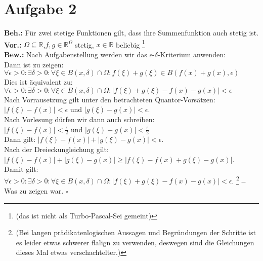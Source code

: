 \documentclass[12pt, a4paper]{article}
\newcommand*{\qed}{\null\nobreak\hfill\ensuremath{\square}}
\newcommand*{\puffer}{\text{ }\text{ }\text{ }\text{ }}
\newcommand*{\gedanke}{\textbf{-- }}
\begin{document}
\section*{Aufgabe 2}
\textbf{Beh.:} Für zwei stetige Funktionen gilt, dass ihre Summenfunktion auch stetig ist. \\
\textbf{Vor.:} \(\Omega \subseteq \mathbb{R}\),\puffer\(f,g \in \mathbb{R}^\Omega\) stetig, \puffer \(x \in \mathbb{R}\) beliebig \footnote{(das ist nicht als Turbo-Pascal-Sei gemeint)} \\
\textbf{Bew.:} Nach Aufgabenstellung werden wir das \(\epsilon\)-\(\delta\)-Kriterium anwenden:\\
Dann ist zu zeigen: \\
\(\forall \epsilon > 0: \exists \delta > 0: \forall \xi \in B(x, \delta) \cap \Omega: f(\xi) + g(\xi) \in B(f(x) + g(x), \epsilon)\) \\
Dies ist äquivalent zu:\\
\(\forall \epsilon > 0: \exists \delta > 0: \forall \xi \in B(x, \delta) \cap \Omega: |f(\xi) + g(\xi) - f(x) - g(x)|  < \epsilon\) \\
Nach Vorrausetzung gilt unter den betrachteten Quantor-Vorsätzen: \\
\(|f(\xi) - f(x)| < \epsilon\) und \(|g(\xi) - g(x)| < \epsilon\). \\
Nach Vorlesung dürfen wir dann auch schreiben: \\
\(|f(\xi) - f(x)| < \frac\epsilon 2\) und \(|g(\xi) - g(x)| < \frac\epsilon 2\) \\
Dann gilt: \(|f(\xi) - f(x)| + |g(\xi) - g(x)| < \epsilon\). \\
Nach der Dreieckungleichung gilt:\\
\(|f(\xi) - f(x)| + |g(\xi) - g(x)| \ge |f(\xi) - f(x) + g(\xi) - g(x)|\). \\
Damit gilt: \(\forall \epsilon > 0: \exists \delta > 0: \forall \xi \in B(x, \delta) \cap \Omega: |f(\xi) + g(\xi) - f(x) - g(x)|  < \epsilon\). \footnote{(Bei langen prädikatenlogischen Aussagen und Begründungen der Schritte ist es leider etwas schwerer flalign zu verwenden, deswegen sind die Gleichungen dieses Mal etwas verschachtelter.)}
\gedanke Was zu zeigen war. \qed \\
\end{document}

